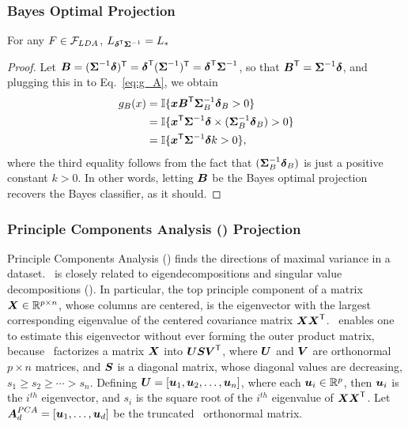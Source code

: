 \documentclass[10pt]{article}
\begin{document}
\subsubsection{Bayes Optimal Projection}

\begin{lem}
For any $F \in \mathcal{F}_{LDA}$, $L_{\boldsymbol{\delta}^{\mathsf{T}} \boldsymbol{\Sigma}^{-1}} = L_*$
\end{lem}

\begin{proof}
Let $\boldsymbol{B} = (\boldsymbol{\Sigma}^{-1} \boldsymbol{\delta})^{\mathsf{T}} = \boldsymbol{\delta}^{\mathsf{T}} (\boldsymbol{\Sigma}^{-1})^{\mathsf{T}} = \boldsymbol{\delta}^{\mathsf{T}} \boldsymbol{\Sigma}^{-1}$, so that $\boldsymbol{B}^{\mathsf{T}} = \boldsymbol{\Sigma}^{-1} \boldsymbol{\delta}$,
and plugging this in to Eq.~\eqref{eq:g_A}, we obtain
\begin{align*}
g_{B}(x) &= \mathbb{I} \{ \boldsymbol{x} \boldsymbol{B}^{\mathsf{T}}  \boldsymbol{\Sigma}^{-1}_{B} \boldsymbol{\delta}_{B} > 0\}
\\&= \mathbb{I} \{ \boldsymbol{x}^{\mathsf{T}} \boldsymbol{\Sigma}^{-1} \boldsymbol{\delta} \times (\boldsymbol{\Sigma}^{-1}_{B} \boldsymbol{\delta}_{B}) > 0\}
\\&= \mathbb{I} \{ \boldsymbol{x}^{\mathsf{T}} \boldsymbol{\Sigma}^{-1} \boldsymbol{\delta} k > 0\},
\end{align*}
where the third equality follows from the fact that $(\boldsymbol{\Sigma}^{-1}_{B} \boldsymbol{\delta}_{B})$ is just a positive constant $k > 0$. In other words, letting $\boldsymbol{B}$ be the Bayes optimal projection recovers the Bayes classifier, as it should.
\end{proof}

\subsubsection{Principle Components Analysis (\Pca) Projection}

Principle Components Analysis (\Pca) finds the directions of maximal variance in a dataset.  \Pca~is closely related to eigendecompositions and singular value decompositions (\Svd).  In particular, the top principle component of a matrix $\boldsymbol{X} \in \mathbb{R}^{p \times n}$, whose columns are centered, is the eigenvector with the largest corresponding eigenvalue of the centered covariance matrix $\boldsymbol{X} \boldsymbol{X}^{\mathsf{T}}$.  \Svd~enables one to estimate this eigenvector without ever forming the outer product matrix, because \Svd~factorizes a matrix $\boldsymbol{X}$ into $\boldsymbol{U} \boldsymbol{S} \boldsymbol{V}^{\mathsf{T}}$, where  $\boldsymbol{U}$ and $\boldsymbol{V}$ are orthonormal  ${p \times n}$ matrices, and $\boldsymbol{S}$ is a diagonal matrix, whose diagonal values are decreasing,  $s_1 \geq s_2 \geq \cdots > s_n$.  Defining $\boldsymbol{U} =[\boldsymbol{u}_1, \boldsymbol{u}_2, \ldots, \boldsymbol{u}_n]$, where each $\boldsymbol{u}_i \in \mathbb{R}^p$, then $\boldsymbol{u}_i$ is the $i^{th}$ eigenvector, and $s_i$ is the square root of the $i^{th}$ eigenvalue of $\boldsymbol{X} \boldsymbol{X}^{\mathsf{T}}$.  Let $\boldsymbol{A}^{PCA}_d =[\boldsymbol{u}_1, \ldots , \boldsymbol{u}_d]$ be the truncated \Pca~orthonormal matrix.
\end{document}
